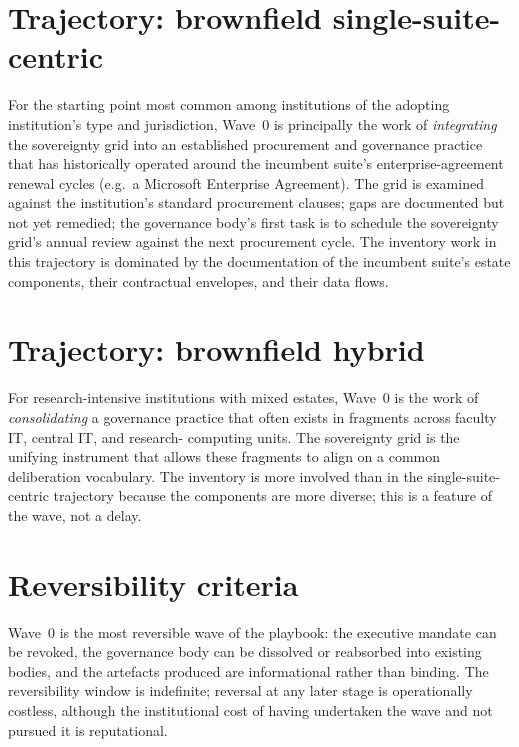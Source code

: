 \section{Trajectory: brownfield single-suite-centric}
\label{sec:w0-brownfield-ms}

For the starting point most common among institutions of the
adopting institution's type and jurisdiction, Wave~0 is principally
the work of \emph{integrating} the sovereignty grid into an
established procurement and governance practice that has historically
operated around the incumbent suite's enterprise-agreement renewal cycles (e.g.\ a Microsoft Enterprise Agreement). The
grid is examined against the institution's standard procurement
clauses; gaps are documented but not yet remedied; the governance
body's first task is to schedule the sovereignty grid's annual
review against the next procurement cycle. The inventory work in
this trajectory is dominated by the documentation of the incumbent
suite's estate components, their contractual envelopes, and their data
flows.

\section{Trajectory: brownfield hybrid}
\label{sec:w0-brownfield-hybrid}

For research-intensive institutions with mixed estates, Wave~0 is
the work of \emph{consolidating} a governance practice that often
exists in fragments across faculty IT, central IT, and research-
computing units. The sovereignty grid is the unifying instrument
that allows these fragments to align on a common deliberation
vocabulary. The inventory is more involved than in the
single-suite-centric trajectory because the components are more
diverse; this is a feature of the wave, not a delay.

\section{Reversibility criteria}
\label{sec:w0-reversibility}

Wave~0 is the most reversible wave of the playbook: the executive
mandate can be revoked, the governance body can be dissolved or
reabsorbed into existing bodies, and the artefacts produced are
informational rather than binding. The reversibility window is
indefinite; reversal at any later stage is operationally costless,
although the institutional cost of having undertaken the wave and
not pursued it is reputational.

